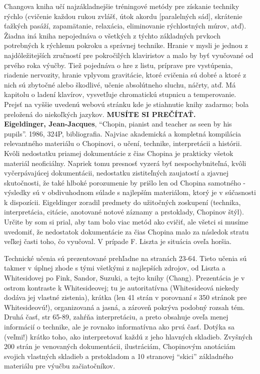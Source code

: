 Changova kniha učí najzákladnejšie tréningové metódy pre získanie techniky rýchlo (cvičenie každou rukou zvlášť, útok akordu [paralelných sád], skrátenie ťažkých pasáží, zapamätanie, relaxácia, eliminovanie rýchlostných múrov, atď). Žiadna iná kniha nepojednáva o všetkých z týchto základných prvkoch potrebných k rýchlemu pokroku a správnej technike. Hranie v mysli je jednou z najdôležitejších zručností pre pokročilých klaviristov a malo by byť vyučované od prvého roka výučby. Tiež pojednáva o hre z listu, príprave pre vystúpenia, riadenie nervozity, hranie vplyvom gravitácie, ktoré cvičenia sú dobré a ktoré z nich sú zbytočné alebo škodlivé, učenie absolútneho sluchu, náčrty, atď. Má kapitolu o ladení klavírov, vysvetľuje chromatickú stupnicu a temperovanie. Prejsť na vyššie uvedenú webovú stránku kde je stiahnutie knihy zadarmo; bola preložená do niekoľkých jazykov. \textbf{MUSÍTE SI PREČÍTAŤ.}
\medskip\\
\textbf{Eigeldinger, Jean-Jacques}, “Chopin, pianist and teacher as seen by his pupils”. 1986, 324P, bibliografia. Najviac akademická a kompletná kompilácia relevantného materiálu o Chopinovi, o učení, technike, interpretácii a histórii. Kvôli nedostatku priamej dokumentácie z čias Chopina je prakticky všetok materiál neoficiálny. Napriek tomu presnosť vyzerá byť nespochybniteľná, kvôli vyčerpávajúcej dokumentácii, nedostatku zistiteľných zaujatostí a zjavnej skutočnosti, že také hlboké porozumenie by prišlo len od Chopina samotného - výsledky sú v obdivuhodnom súlade s najlepším materiálom, ktorý je v súčasnosti k dispozícii. Eigeldinger zoradil predmety do užitočných zoskupení (technika, interpretácia, citácie, anotované notové záznamy a prstoklady, Chopinov štýl). Určite by som si prial, aby tam bolo viac metód ako cvičiť, ale všetci si musíme uvedomiť, že nedostatok dokumentácie za čias Chopina malo za následok stratu veľkej časti toho, čo vyučoval. V prípade F. Liszta je situácia oveľa horšia. 

Technické učenia sú prezentované prehľadne na stranách 23-64. Tieto učenia sú takmer v úplnej zhode s tými všetkými z najlepších zdrojov, od Liszta a Whitesidovej po Fink, Sandor, Suzuki, a tejto knihy (Chang). Prezentácia je v ostrom kontraste k Whitesideovej; tu je autoritatívna (Whitesideová niekedy dodáva jej vlastné zistenia), krátka (len 41 strán v porovnaní s 350 stránok pre Whitesideovú!), organizovaná a jasná, a zároveň pokrýva podobný rozsah tém. Druhá časť, str 65-89, zahŕňa interpretáciu, a preto obsahuje oveľa menej informácií o technike, ale je rovnako informatívna ako prvá časť. Dotýka sa (veľmi!) krátko toho, ako interpretovať každú z jeho hlavných skladieb. Zvyšných 200 strán je venovaných dokumentácii, ilustráciám, Chopinovým anotáciám svojich vlastných skladieb a prstokladom a 10 stranovej “skici” základného materiálu pre výučbu začiatočníkov. 

